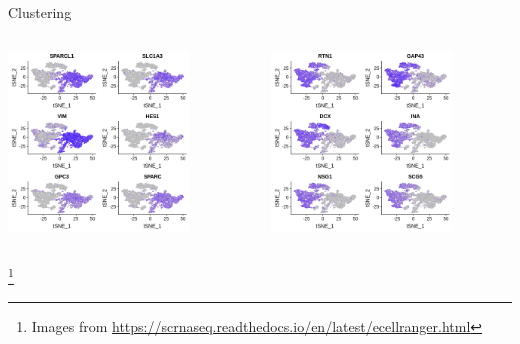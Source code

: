 \documentclass[aspectratio=169,11pt]{beamer}
\newcommand\blfootnote[1]{%
  \begingroup
  \renewcommand\thefootnote{}\footnote{#1}%
  \addtocounter{footnote}{-1}%
  \endgroup
}
\begin{document}
\begin{frame}{Clustering}

	\begin{columns}[T]
		\begin{column}{.45\textwidth}
			\centering
			\includegraphics[width=0.75\textwidth]{figures/eCRfeatureplotmarker.png} 
		\end{column}
		\hfill
		\begin{column}{.45\textwidth}
			\centering
			\includegraphics[width=0.75\textwidth]{figures/eCRfeatureplotpca.png} 
		\end{column}
	\end{columns}
	\blfootnote{Images from \url{https://scrnaseq.readthedocs.io/en/latest/ecellranger.html}}
	
\end{frame}
\end{document}
